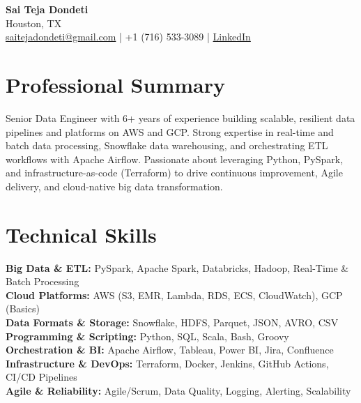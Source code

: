 \documentclass[10pt]{article}
\begin{document}
\begin{center}
    {\LARGE \textbf{Sai Teja Dondeti}} \\ %
    \vspace{2pt}
    Houston, TX \\ %
    \href{mailto:saitejadondeti@gmail.com}{saitejadondeti@gmail.com} \;|\; %
    +1 (716) 533-3089 \;|\; %
    \href{https://www.linkedin.com/in/sai-teja-dondeti/}{LinkedIn} %
\end{center}

\section*{Professional Summary}
Senior Data Engineer with 6+ years of experience building scalable, resilient data pipelines and platforms on AWS and GCP. Strong expertise in real-time and batch data processing, Snowflake data warehousing, and orchestrating ETL workflows with Apache Airflow. %
Passionate about leveraging Python, PySpark, and infrastructure-as-code (Terraform) to drive continuous improvement, Agile delivery, and cloud-native big data transformation. %

\section*{Technical Skills} %

\textbf{Big Data \& ETL:} PySpark, Apache Spark, Databricks, Hadoop, Real-Time \& Batch Processing \\
\textbf{Cloud Platforms:} AWS (S3, EMR, Lambda, RDS, ECS, CloudWatch), GCP (Basics) \\
\textbf{Data Formats \& Storage:} Snowflake, HDFS, Parquet, JSON, AVRO, CSV \\
\textbf{Programming \& Scripting:} Python, SQL, Scala, Bash, Groovy \\
\textbf{Orchestration \& BI:} Apache Airflow, Tableau, Power BI, Jira, Confluence \\
\textbf{Infrastructure \& DevOps:} Terraform, Docker, Jenkins, GitHub Actions, CI/CD Pipelines \\
\textbf{Agile \& Reliability:} Agile/Scrum, Data Quality, Logging, Alerting, Scalability

\end{document}
